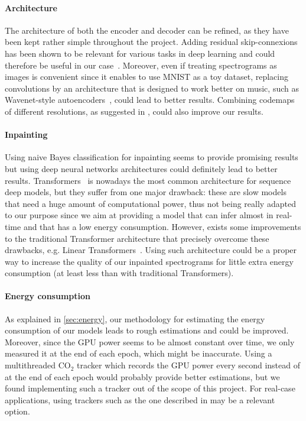 \documentclass{article}
\begin{document}
\paragraph*{Architecture} The architecture of both the encoder and decoder can be refined, as they have been kept rather simple throughout the project. Adding residual skip-connexions has been shown to be relevant for various tasks in deep learning and could therefore be useful in our case~\cite{Resnet}. Moreover, even if treating spectrograms as images is convenient since it enables to use MNIST as a toy dataset, replacing convolutions by an architecture that is designed to work better on music, such as Wavenet-style autoencoders~\cite{Wavenet,NSynth}, could lead to better results. Combining codemaps of different resolutions, as suggested in \cite{VQVAE2}, could also improve our results.

\paragraph*{Inpainting} Using naive Bayes classification for inpainting seems to provide promising results but using deep neural networks architectures could definitely lead to better results. Transformers~\cite{Transformers} is nowadays the most common architecture for sequence deep models, but they suffer from one major drawback: these are slow models that need a huge amount of computational power, thus not being really adapted to our purpose since we aim at providing a model that can infer almost in real-time and that has a low energy consumption. However, exists some improvements to the traditional Transformer architecture that precisely overcome these drawbacks, e.g. Linear Transformers~\cite{LinearTransformers}. Using such architecture could be a proper way to increase the quality of our inpainted spectrograms for little extra energy consumption (at least less than with traditional Transformers).

\paragraph*{Energy consumption}

As explained in \autoref{sec:energy}, our methodology for estimating the energy consumption of our models leads to rough estimations and could be improved. Moreover, since the GPU power seems to be almost constant over time, we only measured it at the end of each epoch, which might be inaccurate. Using a multithreaded CO$_2$ tracker which records the GPU power every second instead of at the end of each epoch would probably provide better estimations, but we found implementing such a tracker out of the scope of this project. For real-case applications, using trackers such as the one described in \cite{Carbontracker} may be a relevant option.
\end{document}
